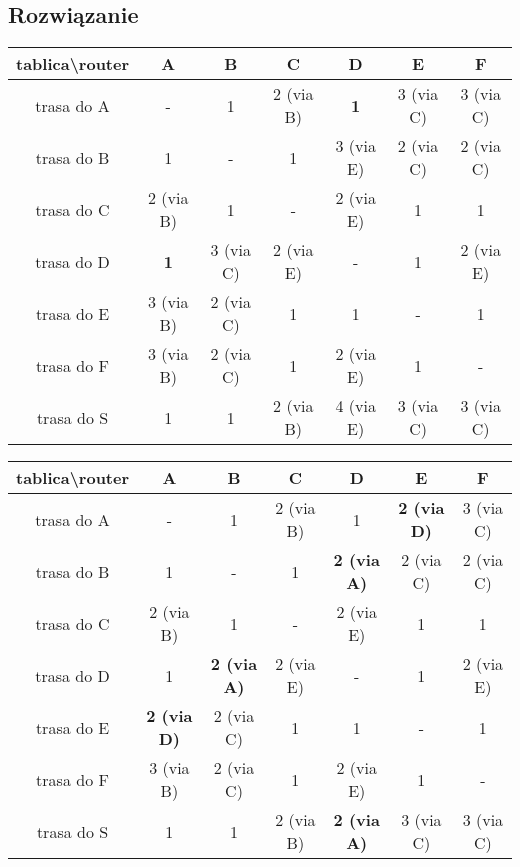 \documentclass[a4paper]{article}
\begin{document}
\subsection{Rozwiązanie}

\begin{center}
\begin{tabular}{ |c|c|c|c|c|c|c| } 
 \hline
 tablica\textbackslash router & A & B & C & D & E & F \\ 
 \hline
 trasa do A & - & 1 & 2 (via B) & \textbf{1} & 3 (via C) & 3 (via C)  \\ 
 \hline
 trasa do B & 1 & - & 1 & 3 (via E) & 2 (via C) & 2 (via C) \\ 
 \hline
 trasa do C & 2 (via B) & 1 & - & 2 (via E) & 1 & 1 \\ 
 \hline
 trasa do D & \textbf{1} & 3 (via C) & 2 (via E) & - & 1 & 2 (via E) \\ 
 \hline
 trasa do E & 3 (via B) & 2 (via C) & 1 & 1 & - & 1 \\ 
 \hline
 trasa do F & 3 (via B) & 2 (via C) & 1 & 2 (via E) & 1 & - \\ 
 \hline
 trasa do S & 1 & 1 & 2 (via B) & 4 (via E) & 3 (via C) & 3 (via C) \\ 
 \hline
\end{tabular}
\end{center}

\begin{center}
\begin{tabular}{ |c|c|c|c|c|c|c| } 
 \hline
 tablica\textbackslash router & A & B & C & D & E & F \\ 
 \hline
 trasa do A & - & 1 & 2 (via B) & 1 & \textbf{2 (via D)} & 3 (via C)  \\ 
 \hline
 trasa do B & 1 & - & 1 & \textbf{2 (via A)} & 2 (via C) & 2 (via C) \\ 
 \hline
 trasa do C & 2 (via B) & 1 & - & 2 (via E) & 1 & 1 \\ 
 \hline
 trasa do D & 1 & \textbf{2 (via A)} & 2 (via E) & - & 1 & 2 (via E) \\ 
 \hline
 trasa do E & \textbf{2 (via D)} & 2 (via C) & 1 & 1 & - & 1 \\ 
 \hline
 trasa do F & 3 (via B) & 2 (via C) & 1 & 2 (via E) & 1 & - \\ 
 \hline
 trasa do S & 1 & 1 & 2 (via B) & \textbf{2 (via A)} & 3 (via C) & 3 (via C) \\ 
 \hline
\end{tabular}
\end{center}
\end{document}
